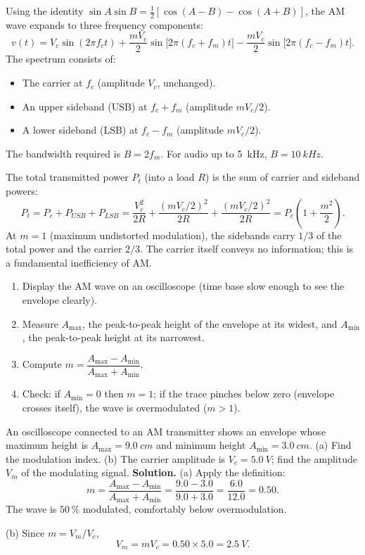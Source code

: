\documentclass[11pt]{article}
\newcommand{\cle}[1]{{\popxbold\color{popdark}#1}}
\begin{document}
\begin{propriete}
Using the identity $\sin A \sin B = \frac{1}{2}[\cos(A-B) - \cos(A+B)]$, the AM wave expands to three frequency components:
\[
v(t) = V_c\sin(2\pi f_c t) + \frac{mV_c}{2}\sin\bigl[2\pi(f_c+f_m)t\bigr] - \frac{mV_c}{2}\sin\bigl[2\pi(f_c-f_m)t\bigr].
\]
The spectrum consists of:
\begin{itemize}
\item The \cle{carrier} at $f_c$ (amplitude $V_c$, unchanged).
\item An \cle{upper sideband} (USB) at $f_c+f_m$ (amplitude $mV_c/2$).
\item A \cle{lower sideband} (LSB) at $f_c-f_m$ (amplitude $mV_c/2$).
\end{itemize}
The \cle{bandwidth} required is $B = 2f_m$. For audio up to \SI{5}{kHz}, $B = \SI{10}{kHz}$.
\end{propriete}

\begin{propriete}
The total transmitted power $P_t$ (into a load $R$) is the sum of carrier and sideband powers:
\[
P_t = P_c + P_{USB} + P_{LSB} = \frac{V_c^2}{2R} + \frac{(mV_c/2)^2}{2R} + \frac{(mV_c/2)^2}{2R} = P_c\left(1 + \frac{m^2}{2}\right).
\]
At $m=1$ (maximum undistorted modulation), the sidebands carry $1/3$ of the total power and the carrier $2/3$. The carrier itself conveys no information; this is a fundamental inefficiency of AM.
\end{propriete}

\begin{methode}
\begin{enumerate}
\item Display the AM wave on an oscilloscope (time base slow enough to see the envelope clearly).
\item Measure $A_{\max}$, the peak-to-peak height of the envelope at its widest, and $A_{\min}$, the peak-to-peak height at its narrowest.
\item Compute $m = \dfrac{A_{\max}-A_{\min}}{A_{\max}+A_{\min}}$.
\item Check: if $A_{\min} = 0$ then $m = 1$; if the trace pinches below zero (envelope crosses itself), the wave is overmodulated ($m>1$).
\end{enumerate}
\end{methode}

\begin{exoresolu}
An oscilloscope connected to an AM transmitter shows an envelope whose maximum height is $A_{\max} = \SI{9.0}{cm}$ and minimum height $A_{\min} = \SI{3.0}{cm}$. (a) Find the modulation index. (b) The carrier amplitude is $V_c = \SI{5.0}{V}$; find the amplitude $V_m$ of the modulating signal.
\tcblower
\textbf{Solution.}
(a) Apply the definition:
\[
m = \frac{A_{\max}-A_{\min}}{A_{\max}+A_{\min}} = \frac{9.0-3.0}{9.0+3.0} = \frac{6.0}{12.0} = 0.50.
\]
The wave is $50\,\%$ modulated, comfortably below overmodulation.

(b) Since $m = V_m/V_c$,
\[
V_m = mV_c = 0.50\times 5.0 = \SI{2.5}{V}.
\]
\end{exoresolu}
\end{document}
